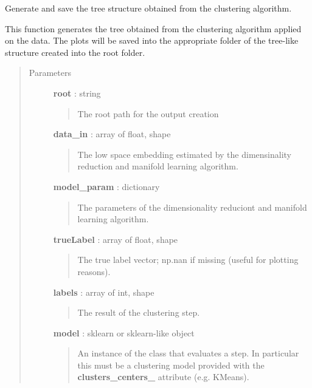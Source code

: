 \documentclass[letterpaper,10pt,english]{sphinxmanual}
\begin{document}
\begin{fulllineitems}
\label{index:adenine.core.analyze_results.make_tree}
Generate and save the tree structure obtained from the clustering algorithm.

This function generates the tree obtained from the clustering algorithm applied on the data. The plots will be saved into the appropriate folder of the tree-like structure created into the root folder.
\begin{quote}\begin{description}
\item[{Parameters}] \leavevmode
\textbf{root} : string
\begin{quote}

The root path for the output creation
\end{quote}

\textbf{data\_in} : array of float, shape
\begin{quote}

The low space embedding estimated by the dimensinality reduction and manifold learning algorithm.
\end{quote}

\textbf{model\_param} : dictionary
\begin{quote}

The parameters of the dimensionality reduciont and manifold learning algorithm.
\end{quote}

\textbf{trueLabel} : array of float, shape
\begin{quote}

The true label vector; np.nan if missing (useful for plotting reasons).
\end{quote}

\textbf{labels} : array of int, shape
\begin{quote}

The result of the clustering step.
\end{quote}

\textbf{model} : sklearn or sklearn-like object
\begin{quote}

An instance of the class that evaluates a step. In particular this must be a clustering model provided with the {\color{red}\bfseries{}clusters\_centers\_} attribute (e.g. KMeans).
\end{quote}

\end{description}\end{quote}

\end{fulllineitems}
\end{document}
